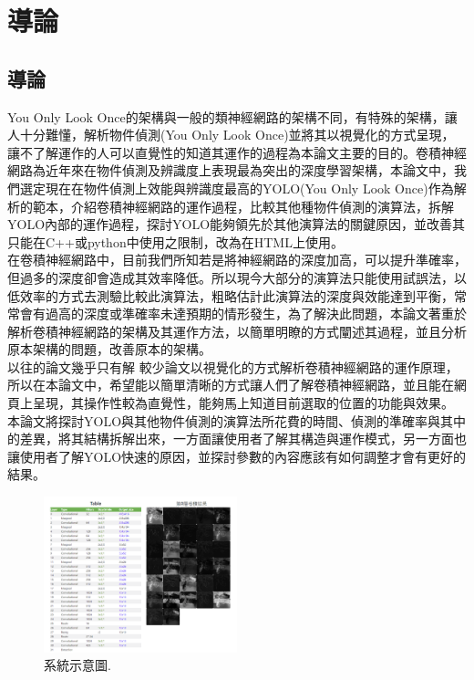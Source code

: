 \chapter{導論}
\label{c:1}

\section{導論}
You Only Look Once的架構與一般的類神經網路的架構不同，有特殊的架構，讓人十分難懂，解析物件偵測(You Only Look Once)並將其以視覺化的方式呈現，讓不了解運作的人可以直覺性的知道其運作的過程為本論文主要的目的。卷積神經網路為近年來在物件偵測及辨識度上表現最為突出的深度學習架構，本論文中，我們選定現在在物件偵測上效能與辨識度最高的YOLO(You Only Look Once)作為解析的範本，介紹卷積神經網路的運作過程，比較其他種物件偵測的演算法，拆解YOLO內部的運作過程，探討YOLO能夠領先於其他演算法的關鍵原因，並改善其只能在C++或python中使用之限制，改為在HTML上使用。
\\
在卷積神經網路中，目前我們所知若是將神經網路的深度加高，可以提升準確率，但過多的深度卻會造成其效率降低。所以現今大部分的演算法只能使用試誤法，以低效率的方式去測驗比較此演算法，粗略估計此演算法的深度與效能達到平衡，常常會有過高的深度或準確率未達預期的情形發生，為了解決此問題，本論文著重於解析卷積神經網路的架構及其運作方法，以簡單明瞭的方式闡述其過程，並且分析原本架構的問題，改善原本的架構。\\
以往的論文幾乎只有解
較少論文以視覺化的方式解析卷積神經網路的運作原理，所以在本論文中，希望能以簡單清晰的方式讓人們了解卷積神經網路，並且能在網頁上呈現，其操作性較為直覺性，能夠馬上知道目前選取的位置的功能與效果。
\\本論文將探討YOLO與其他物件偵測的演算法所花費的時間、偵測的準確率與其中的差異，將其結構拆解出來，一方面讓使用者了解其構造與運作模式，另一方面也讓使用者了解YOLO快速的原因，並探討參數的內容應該有如何調整才會有更好的結果。\\
\begin{figure}[htpb!]
  \centering
    \includegraphics[width=0.5\textwidth]{fig/system1.png}
    \caption{\label{fig:系統1}系統示意圖.}
\end{figure}
